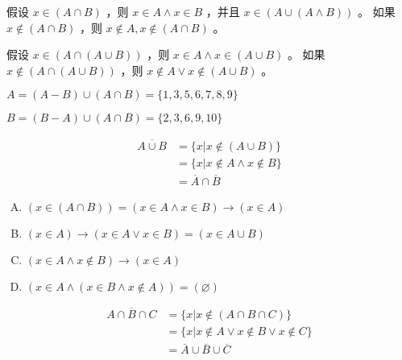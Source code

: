 {{        %
        \begin{practices}
            假设 $x \in (A \cap B)$ ，则 $x \in A \wedge x \in B$ ，并且 $x \in (A \cup (A \wedge B))$ 。
            如果 $x \notin (A \cap B)$ ，则 $x \notin A, x \notin (A \cap B)$ 。
        \end{practices}

        \begin{practices}
            假设 $x \in (A \cap (A \cup B))$ ，则 $x \in A \wedge x \in (A \cup B)$ 。
            如果 $x \notin (A \cap (A \cup B))$ ，则 $x \notin A \vee x \notin (A \cup B)$ 。
        \end{practices}

        \begin{practices}
            $A = (A - B) \cup (A \cap B) = \{1, 3, 5, 6, 7, 8, 9\}$

            $B = (B - A) \cup (A \cap B) = \{2, 3, 6, 9, 10\}$
        \end{practices}

        \begin{practices}
            \begin{align*}
                \overline{A \cup B}
                &= \{x | x \notin (A \cup B)\} \\
                &= \{x | x \notin A \wedge x \notin B\} \\
                &= \overline{A} \cap \overline{B}
            \end{align*}
        \end{practices}

        \begin{practices}
            \begin{enumerate}[A.]
                \item $(x \in (A \cap B)) = (x \in A \wedge x \in B) \rightarrow (x \in A)$
                \item $(x \in A) \rightarrow (x \in A \vee x \in B) = (x \in A \cup B)$
                \item $(x \in A \wedge x \notin B) \rightarrow (x \in A)$
                \item $(x \in A \wedge (x \in B \wedge x \notin A)) = (\varnothing)$
            \end{enumerate}
        \end{practices}

        \begin{practices}
            \begin{align*}
                \overline{A \cap B \cap C}
                &= \{x | x \notin (A \cap B \cap C)\} \\
                &= \{x | x \notin A \vee x \notin B \vee x \notin C\} \\
                &= \overline{A} \cup \overline{B} \cup \overline{C}
            \end{align*}
        \end{practices}

}}
